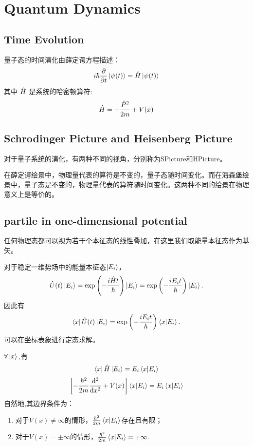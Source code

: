 \chapter{Quantum Dynamics}
\section{Time Evolution}
量子态的时间演化由薛定谔方程描述：
\begin{equation}
    i\hbar \frac{\partial}{\partial t} \left|\psi(t)\right> = \hat{H} \left|\psi(t)\right>
\end{equation}
其中 $\hat{H}$ 是系统的哈密顿算符:
\begin{equation}
    \hat{H}=-\frac{\hat{P}^2}{2m}+V(x)
\end{equation}

\section{Schrodinger Picture and Heisenberg Picture}
对于量子系统的演化，有两种不同的视角，分别称为\gls{SPicture}和\gls{HPicture}。

在薛定谔绘景中，物理量代表的算符是不变的，量子态随时间变化。而在海森堡绘景中，量子态是不变的，物理量代表的算符随时间变化。这两种不同的绘景在物理意义上是等价的。
\section{partile in one-dimensional potential}
任何物理态都可以视为若干个本征态的线性叠加，在这里我们取能量本征态作为基矢。

对于稳定一维势场中的能量本征态$\left|E_i\right>$，
\begin{equation}
    \hat{U}(t)\left|E_i\right>=\exp\left(-\frac{i\hat{H}t}{\hbar}\right)\left|E_i\right>=\exp\left(-\frac{iE_it}{\hbar}\right)\left|E_i\right>.
\end{equation}
因此有
\begin{equation}
    \left<x\right|\hat{U}(t)\left|E_i\right>=\exp\left(-\frac{iE_it}{\hbar}\right)\left<x\middle|E_i\right>.
\end{equation}
可以在坐标表象进行定态求解。

$\forall \left|x\right>, $有
\begin{equation}
    \left<x\right|\hat{H}\left|E_i\right>=E_i\left<x\middle|E_i\right>
\end{equation}
\begin{equation}
    \left[-\frac{\hbar^2}{2m}\frac{\mathrm{d}^2 }{\mathrm{d} x^2}+V(x)\right]\left<x\middle|E_i\right>=E_i\left<x\middle|E_i\right>
\end{equation}
自然地,其边界条件为：
\begin{enumerate}
    \item 对于$V(x)\neq \infty$的情形，$\frac{\hbar^2}{2m}\left<x\middle|E_i\right>$存在且有限；
    \item 对于$V(x)=\pm\infty$的情形，$\frac{\hbar^2}{2m}\left<x\middle|E_i\right>=\mp\infty$.
\end{enumerate}
